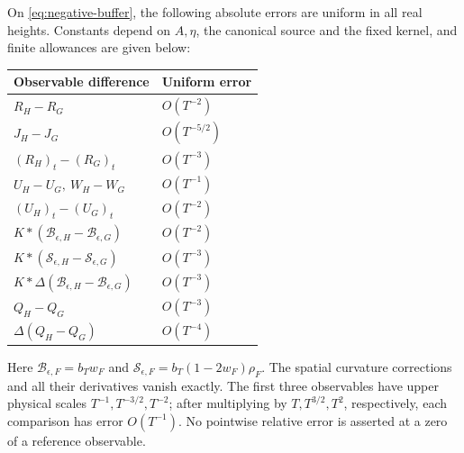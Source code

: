 \begin{theorem}
\label{thm:negative-evolution}
On \eqref{eq:negative-buffer}, the following absolute errors are uniform
in all real heights. Constants depend on $A,\eta$, the canonical source
and the fixed kernel, and finite allowances are given below:
\begin{center}
\begin{tabular}{@{}ll@{}}
\toprule
Observable difference & Uniform error\\
\midrule
$R_H-R_G$ & $O(T^{-2})$\\
$J_H-J_G$ & $O(T^{-5/2})$\\
$(R_H)_t-(R_G)_t$ & $O(T^{-3})$\\
$U_H-U_G,\ W_H-W_G$ & $O(T^{-1})$\\
$(U_H)_t-(U_G)_t$ & $O(T^{-2})$\\
$K*(\mathcal B_{\epsilon,H}-\mathcal B_{\epsilon,G})$
 & $O(T^{-2})$\\
$K*(\mathcal S_{\epsilon,H}-\mathcal S_{\epsilon,G})$
 & $O(T^{-3})$\\
$K*\Delta(\mathcal B_{\epsilon,H}-\mathcal B_{\epsilon,G})$
 & $O(T^{-3})$\\
$Q_H-Q_G$ & $O(T^{-3})$\\
$\Delta(Q_H-Q_G)$ & $O(T^{-4})$\\
\bottomrule
\end{tabular}
\end{center}
Here $\mathcal B_{\epsilon,F}=b_Tw_F$ and
$\mathcal S_{\epsilon,F}=b_T(1-2w_F)\rho_F$.
The spatial curvature corrections and all their derivatives vanish
exactly. The first three observables have upper physical scales
$T^{-1},T^{-3/2},T^{-2}$; after multiplying by $T,T^{3/2},T^2$,
respectively, each comparison has error $O(T^{-1})$.
No pointwise relative error is asserted at a zero of a reference
observable.
\end{theorem}
